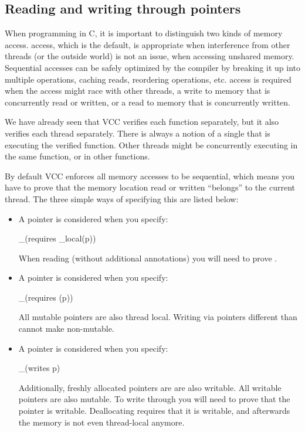 \subsection{Reading and writing through pointers}
\label{sect:writes}

When programming in C, it is important to distinguish two kinds of
memory access.  access, which is the default, is appropriate when
interference from other threads (or the outside world) is not an
issue, \eg when accessing unshared memory. Sequential accesses can be
safely optimized by the compiler by breaking it up into multiple
operations, caching reads, reordering operations, etc. 
 access is required when the access might race with other
threads, \eg a write to memory that is concurrently read or written,
or a read to memory that is concurrently written.

We have already seen that VCC verifies each function separately,
but it also verifies each thread separately. 
There is always a notion of a single 
that is executing the verified function.
Other threads might be concurrently executing in the same
function, or in other functions. 

By default VCC enforces all memory accesses to be sequential,
which means you have to prove that the memory location read
or written ``belongs'' to the current thread.
The three simple ways of specifying this are listed below:

\begin{itemize}
\item A pointer  is considered 
when you specify:
\begin{VCC}
_(requires \thread_local(p))
\end{VCC}
When reading  (without additional annotations) you will need to prove .

\item A pointer  is considered  when you specify:
\begin{VCC}
_(requires \mutable(p))
\end{VCC}
All mutable pointers are also thread local.
Writing via pointers different than  cannot make  non-mutable.

\item A pointer  is considered  when you specify:
\begin{VCC}
_(writes p)
\end{VCC}
Additionally, freshly allocated pointers are are also writable.
All writable pointers are also mutable.
To write through  you will need to prove that the pointer is writable.
Deallocating  requires that it is writable, and afterwards
the memory is not even thread-local anymore.
\end{itemize}

